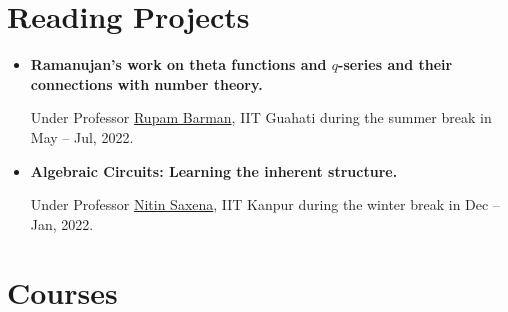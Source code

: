 \documentclass[10pt,a4paper,sans]{moderncv}        %
\begin{document}
	\section{Reading Projects}
		\begin{itemize}
			\item \textbf{Ramanujan's work on theta functions and $q$-series and their connections with number theory.} 
			
			\hfill Under Professor \href{https://www.iitg.ac.in/rupam/}{Rupam Barman}, IIT Guahati during the summer break in May -- Jul, 2022.
			
			\item \textbf{Algebraic Circuits: Learning the inherent structure.}
			
			\hfill Under Professor \href{https://www.cse.iitk.ac.in/users/nitin/}{Nitin Saxena}, IIT Kanpur during the winter break in Dec -- Jan, 2022. 
		\end{itemize}

	\section{Courses}
	
\end{document}
